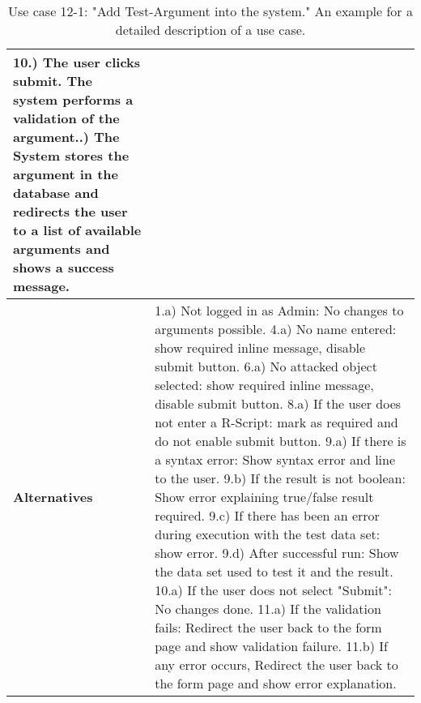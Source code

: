 \begin{table}[h]
{\begin{tabular}{|p{1.3cm} p{11.5cm}|}
					10.) The user clicks submit. The system performs a validation of the argument.\newline
					11.) The System stores the argument in the database and redirects the user to a list of available arguments and shows a success message.
			\\
			\hline
				\textbf{Alternatives} & 
								1.a) Not logged in as Admin: No changes to arguments possible.
					\newline	4.a) No name entered: show required inline message, disable submit button.
					\newline	6.a) No attacked object selected: show required inline message, disable submit button.
					\newline	8.a) If the user does not enter a R-Script: mark as required and do not enable submit button.
					\newline	9.a) If there is a syntax error: Show syntax error and line to the user.
					\newline	9.b) If the result is not boolean: Show error explaining true/false result required.
					\newline	9.c) If there has been an error during execution with the test data set: show error.
					\newline	9.d) After successful run: Show the data set used to test it and the result.
					\newline	10.a) If the user does not select "Submit": No changes done.
					\newline	11.a) If the validation fails: Redirect the user back to the form page and show validation failure.
					\newline	11.b) If any error occurs,  Redirect the user back to the form page and show error explanation.
								\\
			\hline
	
	\end{tabular}
	}

	\caption{Use case 12-1: "Add Test-Argument into the system." An example for a detailed description of a use case.	\label{uc:121}}
\end{table}
